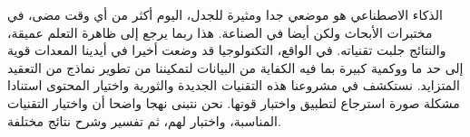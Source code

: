 \begin{RLtext}
الذكاء الاصطناعي هو موضعي جدا ومثيرة للجدل، اليوم أكثر من أي وقت مضى، في مختبرات الأبحاث ولكن أيضا في الصناعة. هذا ربما يرجع إلى ظاهرة التعلم عميقة، والنتائج  جلبت تقنياته. في الواقع، التكنولوجيا قد وضعت أخيرا في أيدينا المعدات قوية إلى حد ما ووكمية كبيرة بما فيه الكفاية من البيانات لتمكيننا من تطوير نماذج من التعقيد المتزايد. نستكشف في مشروعنا هذه التقنيات الجديدة والثورية واختيار المحتوى استنادا مشكلة صورة استرجاع لتطبيق واختبار قوتها. نحن نتبنى نهجا واضحا أن واختيار التقنيات المناسبة، واختبار لهم، ثم تفسير وشرح نتائج مختلفة.
\end{RLtext}